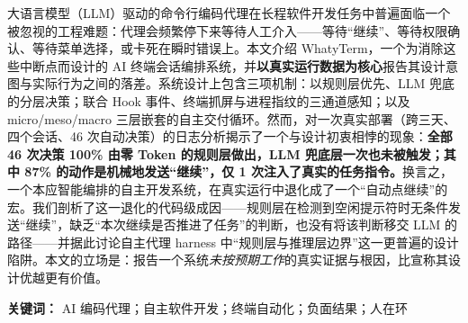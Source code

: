 大语言模型（LLM）驱动的命令行编码代理在长程软件开发任务中普遍面临一个被忽视的工程难题：代理会频繁停下来等待人工介入——等待“继续”、等待权限确认、等待菜单选择，或卡死在瞬时错误上。本文介绍 WhatyTerm，一个为消除这些中断点而设计的 AI 终端会话编排系统，并\textbf{以真实运行数据为核心}报告其设计意图与实际行为之间的落差。系统设计上包含三项机制：以规则层优先、LLM 兜底的分层决策；联合 Hook 事件、终端抓屏与进程指纹的三通道感知；以及 micro/meso/macro 三层嵌套的自主交付循环。然而，对一次真实部署（跨三天、四个会话、46 次自动决策）的日志分析揭示了一个与设计初衷相悖的现象：\textbf{全部 46 次决策 100\% 由零 Token 的规则层做出，LLM 兜底层一次也未被触发；其中 87\% 的动作是机械地发送“继续”，仅 1 次注入了真实的任务指令。}换言之，一个本应智能编排的自主开发系统，在真实运行中退化成了一个“自动点继续”的宏。我们剖析了这一退化的代码级成因——规则层在检测到空闲提示符时无条件发送“继续”，缺乏“本次继续是否推进了任务”的判断，也没有将该判断移交 LLM 的路径——并据此讨论自主代理 harness 中“规则层与推理层边界”这一更普遍的设计陷阱。本文的立场是：报告一个系统\emph{未按预期工作}的真实证据与根因，比宣称其设计优越更有价值。

\vspace{4pt}
\noindent\textbf{关键词：} AI 编码代理；自主软件开发；终端自动化；负面结果；人在环
